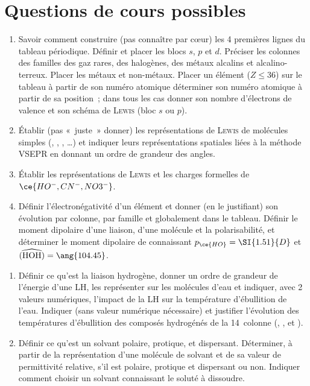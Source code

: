 \documentclass[a4paper, 12pt, final, garamond]{book}
\begin{document}
\newpage
\section{Questions de cours possibles}
\begin{enumerate}
	\item Savoir comment construire (pas connaître par cœur) les 4 premières
	      lignes du tableau périodique. Définir et placer les blocs $s$, $p$ et
	      $d$. Préciser les colonnes des familles des gaz rares, des halogènes,
	      des métaux alcalins et alcalino-terreux. Placer les métaux et
	      non-métaux. Placer un élément ($Z \leq 36$) sur le tableau à partir de
	      son numéro atomique \textbf{} déterminer son numéro atomique
	      à partir de sa position~; dans tous les cas donner son nombre
	      d'électrons de valence et son schéma de \textsc{Lewis} (bloc $s$ ou
	      $p$).
	\item Établir (pas «~juste~» donner) les représentations de \textsc{Lewis}
	      de molécules simples (, , , …) et
	      indiquer leurs représentations spatiales liées à la méthode VSEPR en
	      donnant un ordre de grandeur des angles.
	\item Établir les représentations de \textsc{Lewis} et les charges formelles
	      de $\ce{HO^-, CN^-, NO3^-}$.
	\item Définir l'électronégativité d'un élément et donner (en le justifiant)
	      son évolution par colonne, par famille et globalement dans le tableau.
	      Définir le moment dipolaire d'une liaison, d'une molécule et la
	      polarisabilité, et déterminer le moment dipolaire de 
	      connaissant $p_{\ce{HO}} = \SI{1.51}{D}$ et $\widehat{({\rm HOH})} =
		      \ang{104.45}$.
\end{enumerate}
\begin{enumerate}[resume]
	\item Définir ce qu'est la liaison hydrogène, donner un ordre de grandeur de
	      l'énergie d'une LH, les représenter sur les molécules d'eau et indiquer,
	      avec 2 valeurs numériques, l'impact de la LH sur la température
	      d'ébullition de l'eau. Indiquer (sans valeur numérique nécessaire) et
	      justifier l'évolution des températures d'ébullition des composés
	      hydrogénés de la 14\ieme\ colonne (, ,  et
	      ).
	\item Définir ce qu'est un solvant polaire, protique, et dispersant.
	      Déterminer, à partir de la représentation d'une molécule de solvant et
	      de sa valeur de permittivité relative, s'il est polaire, protique et
	      dispersant ou non. Indiquer comment choisir un solvant connaissant le
	      soluté à dissoudre.
\end{enumerate}
\end{document}

